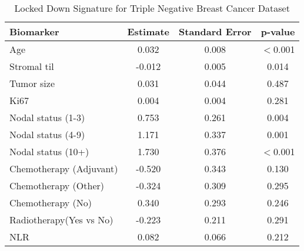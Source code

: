 \begin{table}
\centering
\caption{\label{tab:}Locked Down Signature for Triple Negative Breast Cancer Dataset}
\begin{tabular}{lccc}
\toprule
 Biomarker & Estimate & Standard Error & p-value \\
\midrule
Age & 0.032 & 0.008 & $<$0.001\\
Stromal til & -0.012 & 0.005 & 0.014\\
Tumor size & 0.031 & 0.044 & 0.487\\
Ki67 & 0.004 & 0.004 & 0.281\\
Nodal status (1-3) & 0.753 & 0.261 & 0.004\\
Nodal status (4-9) & 1.171 & 0.337 & 0.001\\
Nodal status (10+) & 1.730 & 0.376 & $<$0.001\\
Chemotherapy (Adjuvant) & -0.520 & 0.343 & 0.130\\
Chemotherapy (Other) & -0.324 & 0.309 & 0.295\\
Chemotherapy (No) & 0.340 & 0.293 & 0.246\\
Radiotherapy(Yes vs No) & -0.223 & 0.211 & 0.291\\
NLR & 0.082 & 0.066 & 0.212\\
\bottomrule
\end{tabular}
\end{table}